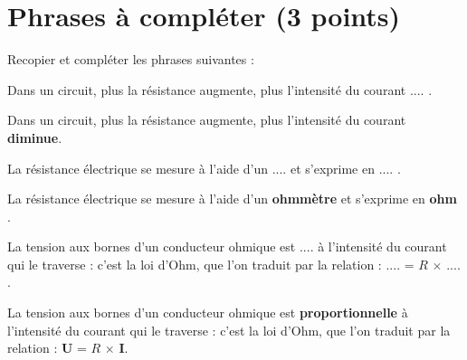 \section{Phrases à compléter (3 points)}

Recopier et compléter les phrases suivantes :

\begin{questions}
	\question[\half] Dans un circuit, plus la résistance augmente, plus l'intensité du courant $....$ .
	\begin{solution}
		Dans un circuit, plus la résistance augmente, plus l'intensité du courant \textbf{diminue}.
	\end{solution}
	
	\question[1] La résistance électrique se mesure à l'aide d'un $....$ et s'exprime en $....$ .
	\begin{solution}
		La résistance électrique se mesure à l'aide d'un \textbf{ohmmètre} et s'exprime en \textbf{ohm} .
	\end{solution}
	
	\question[1\half] La tension aux bornes d'un conducteur ohmique est $....$ à l'intensité du courant qui le traverse : c'est la loi d'Ohm, que l'on traduit par la relation : $....$ = $R$ $\times$  $....$.
	
	\begin{solution}
		La tension aux bornes d'un conducteur ohmique est \textbf{proportionnelle} à l'intensité du courant qui le traverse : c'est la loi d'Ohm, que l'on traduit par la relation : $\mathbf{U}$ = $R$ $\times$  $\mathbf{I}$.
	\end{solution}
\end{questions}